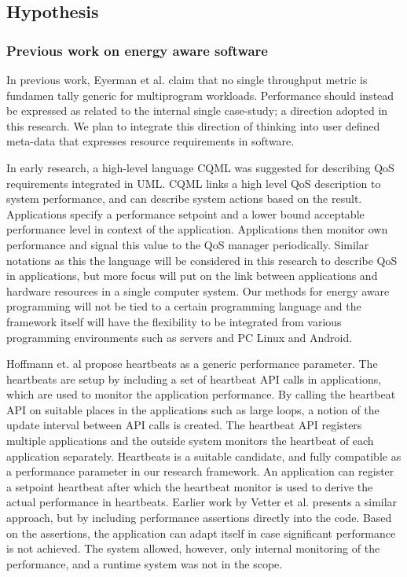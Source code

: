 \documentclass{article}
\begin{document}
\subsection{Hypothesis}

\subsubsection{Previous work on energy aware software}
In previous work, Eyerman et al. \cite{Eyerman:09} claim that no single throughput metric is fundamen tally generic for multiprogram workloads. 
Performance should instead be expressed as related to the internal single case-study; a direction adopted in this research. 
We plan to integrate this direction of thinking into user defined meta-data that expresses resource requirements in software.

In early research, a high-level language CQML \cite{Aagedal:01} was suggested for describing QoS requirements integrated in UML. 
CQML links a high level QoS description to system performance, and can describe system actions based on the result. 
Applications specify a performance setpoint and a lower bound acceptable performance level in context of the application. 
Applications then monitor own performance and signal this value to the QoS manager periodically. 
Similar notations as this the language will be considered in this research to describe QoS in applications, 
but more focus will put on the link between applications and hardware resources in a single computer system.
Our methods for energy aware programming will not be tied to a certain programming language and the framework itself will have the flexibility to be integrated from various programming environments such as servers and PC Linux and Android.

Hoffmann et. al propose heartbeats \cite{Hoffmann:10} as a generic performance parameter. 
The heartbeats are setup by including a set of heartbeat API calls in applications, which are used to monitor the application performance. 
By calling the heartbeat API on suitable places in the applications such as large loops, a notion of the update interval between API calls is created. 
The heartbeat API registers multiple applications and the outside system monitors the heartbeat of each application separately. 
Heartbeats is a suitable candidate, and fully compatible as a performance parameter in our research framework.
An application can register a setpoint heartbeat after which the heartbeat monitor is used to derive the actual performance in heartbeats. 
Earlier work by Vetter et al. \cite{Vetter:02} presents a similar approach, but by including performance assertions directly into the code. 
Based on the assertions, the application can adapt itself in case significant performance is not achieved.
The system allowed, however, only internal monitoring of the performance, and a runtime system was not in the scope.
\end{document}
